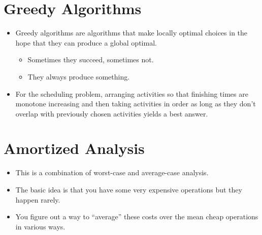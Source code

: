 \documentclass[12pt]{scrartcl}
\begin{document}
\section{Greedy Algorithms}
\begin{itemize}
    \item Greedy algorithms are algorithms that make locally optimal choices in the hope that they can produce a global optimal.
        \begin{itemize}
            \item Sometimes they succeed, sometimes not.
            \item They always produce something.
        \end{itemize}

    \item For the scheduling problem, arranging activities so that finishing times are monotone increasing and then taking activities in order as long as they don't overlap with previously chosen activities yields a best answer.
\end{itemize}


\section{Amortized Analysis}
\begin{itemize}
    \item This is a combination of worst-case and average-case analysis.
    \item The basic idea is that you have some very expensive operations but they happen rarely.
    \item You figure out a way to ``average'' these costs over the mean cheap operations in various ways.
\end{itemize}
\end{document}
